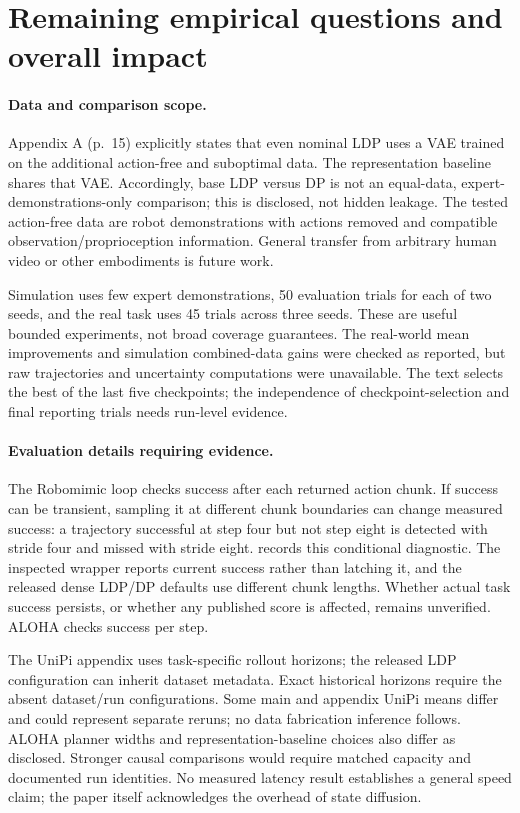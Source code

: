 \documentclass[10pt]{article}
\begin{document}
\section*{Remaining empirical questions and overall impact}
\paragraph*{Data and comparison scope.}\mbox{}\par
Appendix A (p. 15) explicitly states that even nominal LDP uses a VAE trained on the additional action-free and suboptimal data. The representation baseline shares that VAE. Accordingly, base LDP versus DP is not an equal-data, expert-demonstrations-only comparison; this is disclosed, not hidden leakage. The tested action-free data are robot demonstrations with actions removed and compatible observation/proprioception information. General transfer from arbitrary human video or other embodiments is future work.\par
Simulation uses few expert demonstrations, 50 evaluation trials for each of two seeds, and the real task uses 45 trials across three seeds. These are useful bounded experiments, not broad coverage guarantees. The real-world mean improvements and simulation combined-data gains were checked as reported, but raw trajectories and uncertainty computations were unavailable. The text selects the best of the last five checkpoints; the independence of checkpoint-selection and final reporting trials needs run-level evidence.\par
\paragraph*{Evaluation details requiring evidence.}\mbox{}\par
The Robomimic loop checks success after each returned action chunk. If success can be transient, sampling it at different chunk boundaries can change measured success: a trajectory successful at step four but not step eight is detected with stride four and missed with stride eight. records this conditional diagnostic. The inspected wrapper reports current success rather than latching it, and the released dense LDP/DP defaults use different chunk lengths. Whether actual task success persists, or whether any published score is affected, remains unverified. ALOHA checks success per step.\par
The UniPi appendix uses task-specific rollout horizons; the released LDP configuration can inherit dataset metadata. Exact historical horizons require the absent dataset/run configurations. Some main and appendix UniPi means differ and could represent separate reruns; no data fabrication inference follows. ALOHA planner widths and representation-baseline choices also differ as disclosed. Stronger causal comparisons would require matched capacity and documented run identities. No measured latency result establishes a general speed claim; the paper itself acknowledges the overhead of state diffusion.\par
\end{document}
